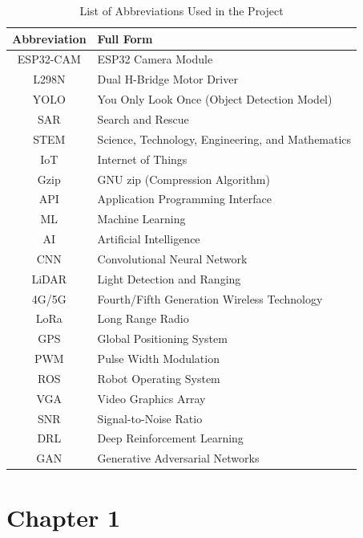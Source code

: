 \documentclass[12pt,a4paper]{report}
\begin{document}
\begin{table}[ht]
\centering
\begin{tabular}{|c|l|}
\hline
\textbf{Abbreviation} & \textbf{Full Form} \\ \hline
ESP32-CAM & ESP32 Camera Module \\ \hline
L298N & Dual H-Bridge Motor Driver \\ \hline
YOLO & You Only Look Once (Object Detection Model) \\ \hline
SAR & Search and Rescue \\ \hline
STEM & Science, Technology, Engineering, and Mathematics \\ \hline
IoT & Internet of Things \\ \hline
Gzip & GNU zip (Compression Algorithm) \\ \hline
API & Application Programming Interface \\ \hline
ML & Machine Learning \\ \hline
AI & Artificial Intelligence \\ \hline
CNN & Convolutional Neural Network \\ \hline
LiDAR & Light Detection and Ranging \\ \hline
4G/5G & Fourth/Fifth Generation Wireless Technology \\ \hline
LoRa & Long Range Radio \\ \hline
GPS & Global Positioning System \\ \hline
PWM & Pulse Width Modulation \\ \hline
ROS & Robot Operating System \\ \hline
VGA & Video Graphics Array \\ \hline
SNR & Signal-to-Noise Ratio \\ \hline
DRL & Deep Reinforcement Learning \\ \hline
GAN & Generative Adversarial Networks \\ \hline
\end{tabular}
\caption{List of Abbreviations Used in the Project}
\label{tab:abbreviations}
\end{table}




	\renewcommand{\thesection}{\arabic{section}}
	
	\newpage
	{\vfill \chapter*{\centering \vfill Chapter 1 \vfill}\vfill}
	\thispagestyle{empty}
	\newpage
\end{document}
